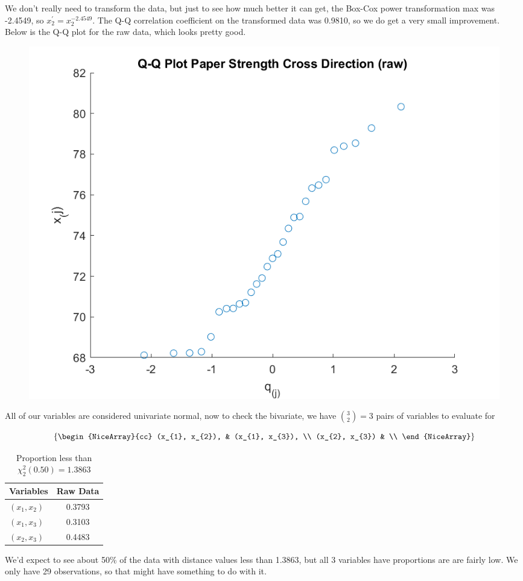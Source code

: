 We don't really need to transform the data, but just to see how much better it can get, the Box-Cox power transformation max was -2.4549, so $x_{2}^{\prime} = x_{2}^{-2.4549}$. The Q-Q correlation coefficient on the transformed data was 0.9810, so we do get a very small improvement. Below is the Q-Q plot for the raw data, which looks pretty good.

\begin{center}
    \begin{figure}[H]
        \centering
        \includegraphics[scale=0.6]{./matlab/chapter-4/sol4.35.qq.3.png}
    \end{figure}
\end{center}


All of our variables are considered univariate normal, now to check the bivariate, we have ${3 \choose 2} = 3$ pairs of variables to evaluate for

\[
\left\{
    \begin{NiceArray}{cc}
        (x_{1}, x_{2}), & (x_{1}, x_{3}), \\
        (x_{2}, x_{3}) &                 \\
    \end{NiceArray}
\right\}
\]

\begin{table}[H]
    \caption*{Proportion less than $\chi_{2}^{2}(0.50) = 1.3863$}
    \centering
    \begin{tabular}{lc}
        \hline %
        Variables & Raw Data \\
        \hline %
        $(x_{1}, x_{2})$ & 0.3793 \\
        $(x_{1}, x_{3})$ & 0.3103 \\
        $(x_{2}, x_{3})$ & 0.4483 \\
        \hline %
    \end{tabular}
\end{table}

We'd expect to see about 50\% of the data with distance values less than 1.3863, but all 3 variables have proportions are are fairly low. We only have 29 observations, so that might have something to do with it.